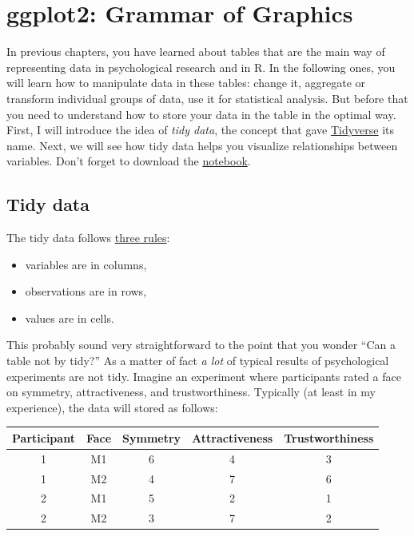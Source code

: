 \documentclass[
]{book}
\providecommand{\tightlist}{%
  \setlength{\itemsep}{0pt}\setlength{\parskip}{0pt}}
\begin{document}
\hypertarget{ggplot2}{%
\chapter{ggplot2: Grammar of Graphics}\label{ggplot2}}

In previous chapters, you have learned about tables that are the main way of representing data in psychological research and in R. In the following ones, you will learn how to manipulate data in these tables: change it, aggregate or transform individual groups of data, use it for statistical analysis. But before that you need to understand how to store your data in the table in the optimal way. First, I will introduce the idea of \emph{tidy data}, the concept that gave \href{https://www.tidyverse.org/}{Tidyverse} its name. Next, we will see how tidy data helps you visualize relationships between variables. Don't forget to download the \href{notebooks/Seminar\%2005\%20-\%20ggplot2.Rmd}{notebook}.

\hypertarget{tidydata}{%
\section{Tidy data}\label{tidydata}}

The tidy data follows \href{https://r4ds.had.co.nz/tidy-data.html}{three rules}:

\begin{itemize}
\tightlist
\item
  variables are in columns,
\item
  observations are in rows,
\item
  values are in cells.
\end{itemize}

This probably sound very straightforward to the point that you wonder ``Can a table not by tidy?'' As a matter of fact \emph{a lot} of typical results of psychological experiments are not tidy. Imagine an experiment where participants rated a face on symmetry, attractiveness, and trustworthiness. Typically (at least in my experience), the data will stored as follows:

\begin{tabular}{c|c|c|c|c}
\hline
Participant & Face & Symmetry & Attractiveness & Trustworthiness\\
\hline
1 & M1 & 6 & 4 & 3\\
\hline
1 & M2 & 4 & 7 & 6\\
\hline
2 & M1 & 5 & 2 & 1\\
\hline
2 & M2 & 3 & 7 & 2\\
\hline
\end{tabular}
\end{document}
